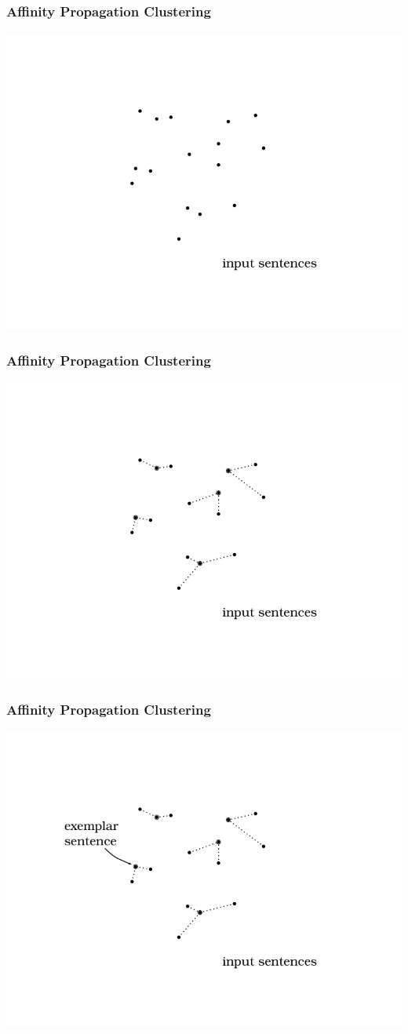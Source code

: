 \documentclass{beamer}
\begin{document}
\begin{frame}
\frametitle{Affinity Propagation Clustering}
    \includegraphics{images/cluster_anim1.pdf}
\end{frame}
\begin{frame}
\frametitle{Affinity Propagation Clustering}
    \includegraphics{images/cluster_anim2.pdf}
\end{frame}
\begin{frame}
\frametitle{Affinity Propagation Clustering}
    \includegraphics{images/cluster_anim3.pdf}
\end{frame}
\end{document}

